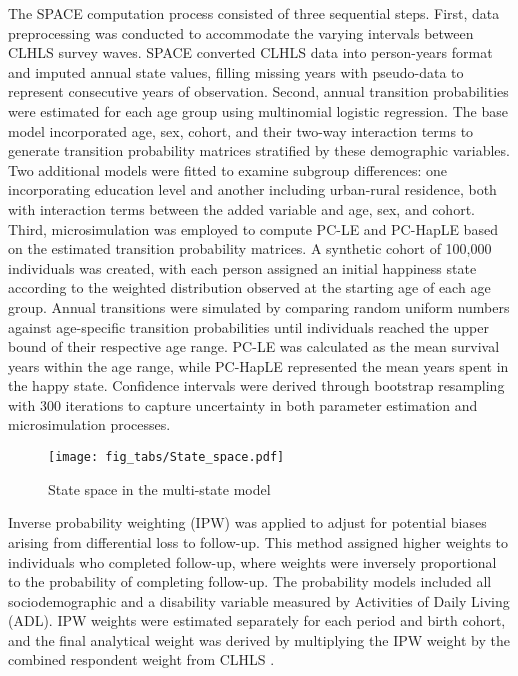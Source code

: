 \documentclass[12pt, a4paper]{article}
\begin{document}
The SPACE computation process consisted of three sequential steps. First, data preprocessing was conducted to accommodate the varying intervals between CLHLS survey waves. SPACE converted CLHLS data into person-years format and imputed annual state values, filling missing years with pseudo-data to represent consecutive years of observation. Second, annual transition probabilities were estimated for each age group using multinomial logistic regression. The base model incorporated age, sex, cohort, and their two-way interaction terms to generate transition probability matrices stratified by these demographic variables. Two additional models were fitted to examine subgroup differences: one incorporating education level and another including urban-rural residence, both with interaction terms between the added variable and age, sex, and cohort. Third, microsimulation was employed to compute PC-LE and PC-HapLE based on the estimated transition probability matrices. A synthetic cohort of 100,000 individuals was created, with each person assigned an initial happiness state according to the weighted distribution observed at the starting age of each age group. Annual transitions were simulated by comparing random uniform numbers against age-specific transition probabilities until individuals reached the upper bound of their respective age range. PC-LE was calculated as the mean survival years within the age range, while PC-HapLE represented the mean years spent in the happy state. Confidence intervals were derived through bootstrap resampling with 300 iterations to capture uncertainty in both parameter estimation and microsimulation processes.

\begin{figure}[htbp]
  \centering
  \texttt{[image: fig\_tabs/State\_space.pdf]}
  \caption{State space in the multi-state model}
  \label{fig:State_space}
\end{figure}

Inverse probability weighting (IPW) was applied to adjust for potential biases arising from differential loss to follow-up. This method assigned higher weights to individuals who completed follow-up, where weights were inversely proportional to the probability of completing follow-up. The probability models included all sociodemographic and a disability variable measured by Activities of Daily Living (ADL). IPW weights were estimated separately for each period and birth cohort, and the final analytical weight was derived by multiplying the IPW weight by the combined respondent weight from CLHLS \autocite{dugoff.2014.generalizing,liu.2019.are}.
\end{document}
